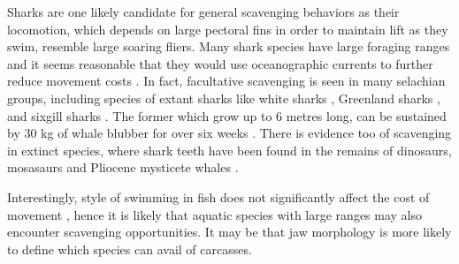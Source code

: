 \documentclass[a4paper,12pt]{article}
\begin{document}
Sharks are one likely candidate for general scavenging behaviors as their locomotion, which depends on large pectoral fins in order to maintain lift as they swim, resemble large soaring fliers.
Many shark species have large foraging ranges \citep[e.g. the great white sharks \textit{Carcharodon carcharias};][]{bruce2006movements} and it seems reasonable that they would use oceanographic currents to further reduce movement costs \citep{ruxton2004energetic}. %
In fact, facultative scavenging is seen in many selachian groups, including species of extant sharks like white sharks \citep[known to feed on whale carcasses;][]{fallows2013white}, Greenland sharks \citep[feeding on seals;][]{watanabe2012slowest}, and sixgill sharks \citep{anderson2016impact}. 
The former which grow up to 6 metres long, can be sustained by 30 kg of whale blubber for over six weeks \citep{carey1982temperature}. 
There is evidence too of scavenging in extinct species, where shark teeth have been found in the remains of dinosaurs, mosasaurs and Pliocene mysticete whales \citep[5.3-3.6 Mya; ][]{schwimmer1997scavenging,ehret2009caught}. 

Interestingly, style of swimming in fish does not significantly affect the cost of movement \citep{williams1999evolution}, hence it is likely that aquatic species with large ranges may also encounter scavenging opportunities. It may be that jaw morphology is more likely to define which species can avail of carcasses.
\end{document}

